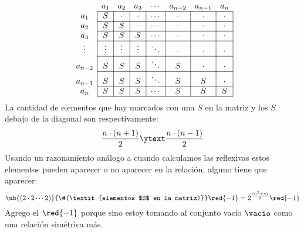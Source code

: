 $$
  \begin{array}{c|c|c|c|c|c|c|c|}
    \multicolumn{1}{c}{} & \multicolumn{1}{c}{a_1} & \multicolumn{1}{c}{a_2} & \multicolumn{1}{c}{a_3} & \multicolumn{1}{c}{\cdots} & \multicolumn{1}{c}{a_{n-2}} & \multicolumn{1}{c}{a_{n-1}} & \multicolumn{1}{c}{a_n} \\ \cline{2-8}
    a_1                  & S                       & \cdot                   & \cdot                   & \cdots                     & \cdot                       & \cdot                       & \cdot                   \\ \cline{2-8}
    a_2                  & S                       & S                       & \cdot                   & \cdots                     & \cdot                       & \cdot                       & \cdot                   \\ \cline{2-8}
    a_3                  & S                       & S                       & S                       & \cdots                     & \cdot                       & \cdot                       & \cdot                   \\ \cline{2-8}
    \vdots               & \vdots                  & \vdots                  & \vdots                  & \ddots                     & \cdot                       & \cdot                       & \cdot                   \\ \cline{2-8}
    a_{n-2}              & S                       & S                       & S                       & \ddots                     & S                           & \cdot                       & \cdot                   \\ \cline{2-8}
    a_{n-1}              & S                       & S                       & S                       & \ddots                     & S                           & S                           & \cdot                   \\ \cline{2-8}
    a_n                  & S                       & S                       & S                       & \cdots                     & S                           & S                           & S                       \\ \cline{2-8}
  \end{array}
$$
La cantidad de elementos que hay marcados con una $S$ en la matriz y los $S$ debajo de la diagonal son respectivamente:
$$
  \frac{n \cdot (n+1)}{2}
  \ytext
  \frac{n \cdot (n - 1)}{2}
$$
Usando un razonamiento análogo a cuando calculamos las reflexivas estos elementos pueden aparecer o no aparecer
en la relación,  alguno tiene que aparecer:
$$
  \ub{(2 \cdot 2 \cdots 2)}{\#(\textit{elementos $S$ en la matriz)}} \red{- 1 }
  =
  2^{\frac{(n^2 + n)}{2}} \red{ - 1}
$$
Agrego el $\red{ - 1}$ porque sino estoy tomando al conjunto vacío $\vacio$ como una relación simétrica más.

